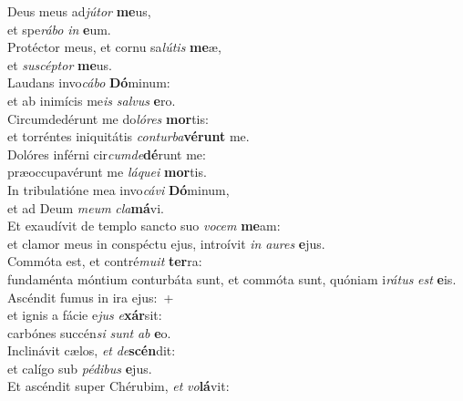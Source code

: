 \evenverse Deus meus ad\textit{jú}\textit{tor} \textbf{me}us,~\*\\
\evenverse et spe\textit{rá}\textit{bo} \textit{in} \textbf{e}um.\\
\oddverse Protéctor meus, et cornu sa\textit{lú}\textit{tis} \textbf{me}æ,~\*\\
\oddverse et \textit{su}\textit{scép}\textit{tor} \textbf{me}us.\\
\evenverse Laudans invo\textit{cá}\textit{bo} \textbf{Dó}minum:~\*\\
\evenverse et ab inimícis me\textit{is} \textit{sal}\textit{vus} \textbf{e}ro.\\
\oddverse Circumdedérunt me do\textit{ló}\textit{res} \textbf{mor}tis:~\*\\
\oddverse et torréntes iniquitátis \textit{con}\textit{tur}\textit{ba}\textbf{vé}\textbf{runt} me.\\
\evenverse Dolóres inférni cir\textit{cum}\textit{de}\textbf{dé}runt me:~\*\\
\evenverse præoccupavérunt me \textit{lá}\textit{que}\textit{i} \textbf{mor}tis.\\
\oddverse In tribulatióne mea invo\textit{cá}\textit{vi} \textbf{Dó}minum,~\*\\
\oddverse et ad Deum \textit{me}\textit{um} \textit{cla}\textbf{má}vi.\\
\evenverse Et exaudívit de templo sancto suo \textit{vo}\textit{cem} \textbf{me}am:~\*\\
\evenverse et clamor meus in conspéctu ejus, introívit \textit{in} \textit{au}\textit{res} \textbf{e}jus.\\
\oddverse Commóta est, et contré\textit{mu}\textit{it} \textbf{ter}ra:~\*\\
\oddverse fundaménta móntium conturbáta sunt, et commóta sunt, quóniam i\textit{rá}\textit{tus} \textit{est} \textbf{e}is.\\
\evenverse Ascéndit fumus in ira ejus:~+\\
\evenverse  et ignis a fácie e\textit{jus} \textit{e}\textbf{xár}sit:~\*\\
\evenverse carbónes succén\textit{si} \textit{sunt} \textit{ab} \textbf{e}o.\\
\oddverse Inclinávit cælos, \textit{et} \textit{de}\textbf{scén}dit:~\*\\
\oddverse et calígo sub \textit{pé}\textit{di}\textit{bus} \textbf{e}jus.\\
\evenverse Et ascéndit super Chérubim, \textit{et} \textit{vo}\textbf{lá}vit:~\*\\

